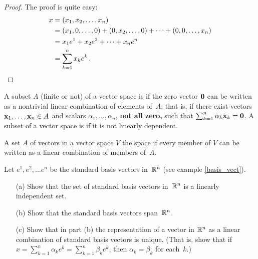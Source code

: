 \begin{proof} The proof is quite easy:
 \begin{align*}
     x &= (x_1,x_2, \dots, x_n) \\
       &= (x_1,0, \dots, 0) + (0,x_2, \dots, 0) + \dots + (0,0,
              \dots, x_n) \\
       &= x_1e^1 + x_2e^2 + \dots + x_ne^n \\
       &= \sum_{k=1}^n x_ke^k\,.    \qedhere
 \end{align*}
\end{proof}

\begin{defn} A subset $A$ (finite or not) of a vector space is
 if the zero vector $\mathbf{0}$ can be written as a nontrivial linear
combination of elements of~$A$; that is, if there exist vectors $\mathbf{x}_1, \dots, \mathbf{x}_n
\in A$ and scalars $\alpha_1, \dots, \alpha_n$, \textbf{not all zero,} such that
$\sum_{k=1}^n \alpha_k\mathbf{x}_k = \mathbf{0}$. A subset of a vector space is
 if it is not linearly dependent.
\end{defn}

\begin{defn} A set $A$ of vectors in a vector space $V$
 the space if every member of $V$ can be written as a linear combination of members
of~$A$.
\end{defn}

\begin{prob}\label{vs_prob3} Let $e^1, e^2, \dots e^n$ be the standard basis vectors in~$\mathbb{R}^n$
(see example \ref{basis_vect}).
 \begin{enumerate}
  \item[(a)] Show that the set of standard basis vectors in~$\mathbb{R}^n$ is a linearly
independent set.
  \item[(b)] Show that the standard basis vectors span~$\mathbb{R}^n$.
  \item[(c)] Show that in part (b) the representation of a vector in $\mathbb{R}^n$ as a linear
combination of standard basis vectors is unique. (That is, show that if $x = \sum_{k=1}^n
\alpha_k e^k = \sum_{k=1}^n \beta_k e^k$, then $\alpha_k = \beta_k$ for each~$k$.)
 \end{enumerate}
\end{prob}








